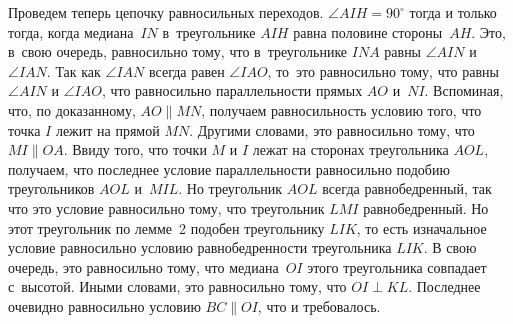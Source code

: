 Проведем теперь цепочку равносильных переходов.
$\angle AIH = 90^\circ$ тогда и только тогда, когда медиана~$IN$
в~треугольнике $AIH$ равна половине стороны~$AH$.
Это, в~свою очередь, равносильно тому, что в~треугольнике $INA$ равны
$\angle AIN$ и $\angle IAN$.
Так как $\angle IAN$ всегда равен $\angle IAO$, то~это равносильно тому,
что равны $\angle AIN$ и $\angle IAO$, что равносильно параллельности
прямых $AO$ и~$NI$.
Вспоминая, что, по доказанному, $AO \parallel MN$, получаем равносильность
условию того, что точка $I$ лежит на прямой $MN$.
Другими словами, это равносильно тому, что $MI \parallel OA$.
Ввиду того, что точки $M$ и $I$ лежат на сторонах треугольника $AOL$, получаем,
что последнее условие параллельности равносильно подобию
треугольников $AOL$ и~$MIL$.
Но треугольник $AOL$ всегда равнобедренный, так что это условие равносильно
тому, что треугольник $LMI$ равнобедренный.
Но этот треугольник по лемме~2 подобен треугольнику $LIK$, то есть
изначальное условие равносильно условию равнобедренности треугольника $LIK$.
В свою очередь, это равносильно тому, что медиана~$OI$ этого треугольника
совпадает с~высотой.
Иными словами, это равносильно тому, что $OI \perp KL$.
Последнее очевидно равносильно условию $BC \parallel OI$, что и требовалось.
\endproblem

